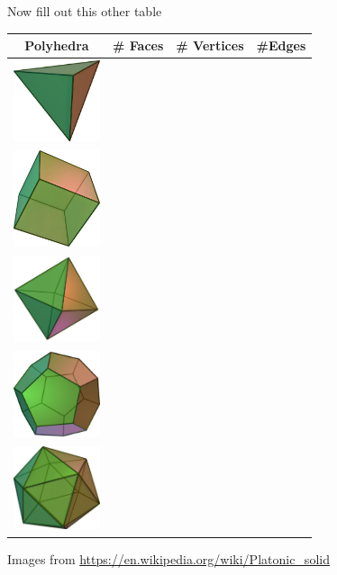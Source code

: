 \documentclass[newpage,hints,handout]{ximera}
\begin{document}
\begin{problem}  Now fill out this other table 

\begin{center}
\begin{tabular}{||c|c|c|c||}
\hline 
\hline 
Polyhedra & \# Faces & \# Vertices & \#Edges\\
\hline
\includegraphics[width=1in]{Tetrahedron} &   &   &  \\\hline
\includegraphics[width=1in]{Hexahedron} &   &   &  \\\hline
\includegraphics[width=1in]{Octahedron} &   &   &  \\\hline
\includegraphics[width=1in]{Dodecahedron} &   &   &  \\\hline
\includegraphics[width=1in]{Icosahedron} &   &   &  \\\hline

\hline
\end{tabular}
\end{center}
Images from \url{https://en.wikipedia.org/wiki/Platonic_solid}
\end{problem}
\end{document}
